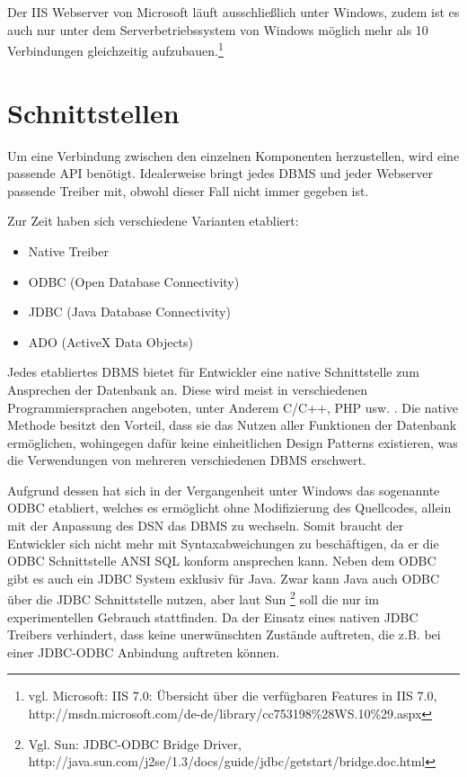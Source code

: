 Der IIS Webserver von Microsoft läuft ausschließlich unter Windows, zudem ist es auch nur unter dem Serverbetriebssystem von Windows möglich mehr als 10 Verbindungen gleichzeitig aufzubauen.\footnote{vgl. Microsoft: IIS 7.0: Übersicht über die verfügbaren Features in IIS 7.0, http://msdn.microsoft.com/de-de/library/cc753198\%28WS.10\%29.aspx}

\section{Schnittstellen}
\label{sec:schnittstellen}


Um eine Verbindung zwischen den einzelnen Komponenten herzustellen, wird eine passende API benötigt.
Idealerweise bringt jedes DBMS und jeder Webserver passende Treiber mit, obwohl dieser Fall nicht immer gegeben ist.

Zur Zeit haben sich verschiedene Varianten etabliert:

\begin{itemize}
\item Native Treiber
\item ODBC (Open Database Connectivity)
\item JDBC (Java Database Connectivity)
\item ADO (ActiveX Data Objects)
\end{itemize}

Jedes etabliertes DBMS bietet für Entwickler eine native Schnittstelle zum Ansprechen der Datenbank an.
Diese wird meist in verschiedenen Programmiersprachen angeboten, unter Anderem C/C++, PHP usw. .
Die native Methode besitzt den Vorteil, dass sie das Nutzen aller Funktionen der Datenbank ermöglichen, wohingegen dafür keine einheitlichen Design Patterns existieren, was die Verwendungen von mehreren
verschiedenen DBMS erschwert.

Aufgrund dessen hat sich in der Vergangenheit unter Windows das sogenannte ODBC etabliert, welches es ermöglicht ohne Modifizierung des Quellcodes, allein mit der Anpassung des DSN das DBMS zu wechseln.
Somit braucht der Entwickler sich nicht mehr mit Syntaxabweichungen zu beschäftigen, da er die ODBC Schnittstelle ANSI SQL konform ansprechen kann.
Neben dem ODBC gibt es auch ein JDBC System exklusiv für Java. Zwar kann Java auch ODBC über die JDBC Schnittstelle nutzen, aber laut Sun \footnote{Vgl. Sun: JDBC-ODBC Bridge Driver, http://java.sun.com/j2se/1.3/docs/guide/jdbc/getstart/bridge.doc.html} soll die nur im experimentellen Gebrauch stattfinden.
Da der Einsatz eines nativen JDBC Treibers verhindert, dass keine unerwünschten Zustände auftreten, die z.B. bei einer JDBC-ODBC Anbindung auftreten können.

